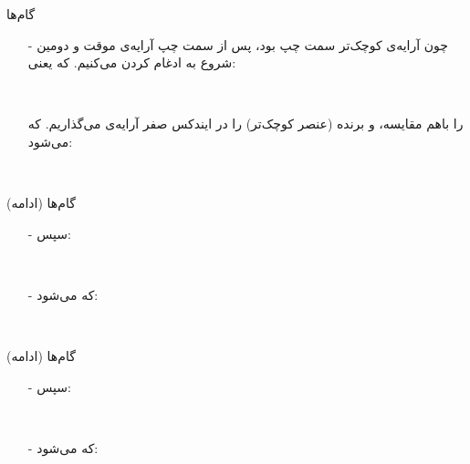 \begin{frame}{گام‌ها}
\begin{itemize}\itemr
\item[-]
چون آرایه‌ی کوچک‌تر سمت چپ بود، پس از سمت چپ‌ آرایه‌ی موقت و دومین  شروع به ادغام کردن می‌کنیم. که یعنی:
\begin{lfl}
\\
\end{lfl}
را باهم مقایسه، و برنده (عنصر کوچک‌تر) را در ایندکس صفر آرایه‌ی  می‌گذاریم. که می‌شود:

\begin{lfl}
\\
\end{lfl}
\end{itemize}
\end{frame}

\begin{frame}{گام‌ها (ادامه)}
\begin{itemize}\itemr
\item[-]
سپس:
\begin{lfl}
\\
\end{lfl}

\item[-]
که می‌شود:
\begin{lfl}
\\
\end{lfl}
\end{itemize}
\end{frame}

\begin{frame}{گام‌ها (ادامه)}
\begin{itemize}\itemr
\item[-]
سپس:
\begin{lfl}
\\
\end{lfl}

\item[-]
که می‌شود:
\begin{lfl}
\\
\end{lfl}
\end{itemize}
\end{frame}

